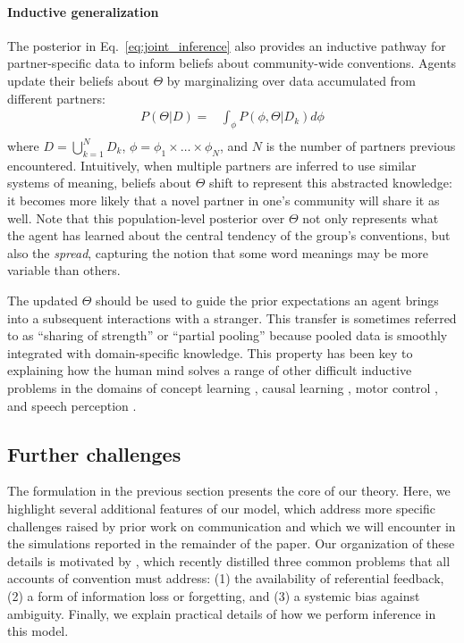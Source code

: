 \paragraph{Inductive generalization}

The posterior in Eq.~\ref{eq:joint_inference} also provides an inductive pathway for partner-specific data to inform beliefs about community-wide conventions.
Agents update their beliefs about $\Theta$ by marginalizing over data accumulated from different partners:
\begin{equation}
\begin{split}
    P(\Theta | D)  = & \int_{\phi} P(\phi, \Theta | D_k) d\phi \\
\end{split}
\end{equation}
where $D = \bigcup_{k=1}^N D_k$, $\phi = \phi_1 \times \dots \times \phi_N$, and $N$ is the number of partners previous encountered. 
Intuitively, when multiple partners are inferred to use similar systems of meaning, beliefs about $\Theta$ shift to represent this abstracted knowledge: it becomes more likely that a novel partner in one's community will share it as well.
Note that this population-level posterior over $\Theta$ not only represents what the agent has learned about the central tendency of the group's conventions, but also the \emph{spread}, capturing the notion that some word meanings may be more variable than others.

The updated $\Theta$ should be used to guide the prior expectations an agent brings into a subsequent interactions with a stranger.
This transfer is sometimes referred to as ``sharing of strength'' or ``partial pooling'' because pooled data is smoothly integrated with domain-specific knowledge.
This property has been key to explaining how the human mind solves a range of other difficult inductive problems in the domains of concept learning \cite{KempPerforsTenenbaum07_HBM, tenenbaum_how_2011}, causal learning \cite{KempGoodmanTenenbaum10_LearningToLearn,GoodmanUllmanTenenbaum11_TheoryOfCausality},  motor control \cite{berniker2008estimating}, and speech perception \cite{kleinschmidt2015robust}.

\subsection{Further challenges}

The formulation in the previous section presents the core of our theory.
Here, we highlight several additional features of our model, which address more specific challenges raised by prior work on communication and which we will encounter in the simulations reported in the remainder of the paper. 
Our organization of these details is motivated by , which recently distilled three common problems that all accounts of convention must address: (1) the availability of referential feedback, (2) a form of information loss or forgetting, and (3) a systemic bias against ambiguity.
Finally, we explain practical details of how we perform inference in this model. 

